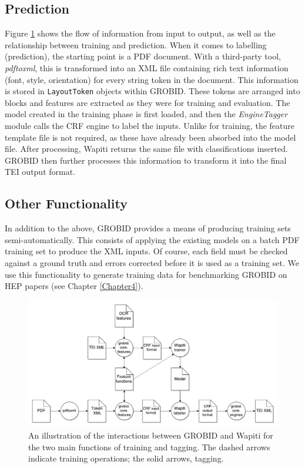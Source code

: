 \subsection{Prediction}

Figure \ref{fig:flow} shows the flow of information from input to output, as well as the relationship between training and prediction. When it comes to labelling (prediction), the starting point is a PDF document. With a third-party tool, \emph{pdftoxml}, this is transformed into an XML file containing rich text information (font, style, orientation) for every string token in the document. This information is stored in \texttt{LayoutToken} objects within GROBID. These tokens are arranged into blocks and features are extracted as they were for training and evaluation. The model created in the training phase is first loaded, and then the \emph{EngineTagger} module calls the CRF engine to label the inputs. Unlike for training, the feature template file is not required, as these have already been absorbed into the model file. After processing, Wapiti returns the same file with classifications inserted. GROBID then further processes this information to transform it into the final TEI output format.

\subsection{Other Functionality}

In addition to the above, GROBID provides a means of producing training sets semi-automatically. This consists of applying the existing models on a batch PDF training set to produce the XML inputs. Of course, each field must be checked against a ground truth and errors corrected before it is used as a training set. We use this functionality to generate training data for benchmarking GROBID on HEP papers (see Chapter \ref{Chapter4}).

\begin{figure}[!ht]
\center
\includegraphics[width=\textwidth]{Figures/grobid.pdf}
\caption{An illustration of the interactions between GROBID and Wapiti for the two main functions of training and tagging. The dashed arrows indicate training operations; the solid arrows, tagging.}
\label{fig:flow}
\end{figure}

